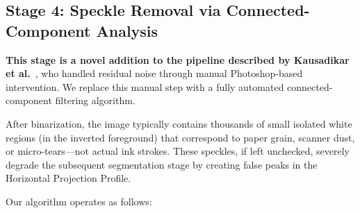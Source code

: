 \documentclass[12pt, a4paper]{article}
\begin{document}
\vspace{0.3em}
\noindent{}


\subsection{Stage 4: Speckle Removal via Connected-Component Analysis}
\label{sec:speckle}

\textbf{This stage is a novel addition to the pipeline described by Kausadikar et al.}~\cite{kausadikar2025}, who handled residual noise through manual Photoshop-based intervention. We replace this manual step with a fully automated connected-component filtering algorithm.

After binarization, the image typically contains thousands of small isolated white regions (in the inverted foreground) that correspond to paper grain, scanner dust, or micro-tears---not actual ink strokes. These speckles, if left unchecked, severely degrade the subsequent segmentation stage by creating false peaks in the Horizontal Projection Profile.

Our algorithm operates as follows:
\end{document}

